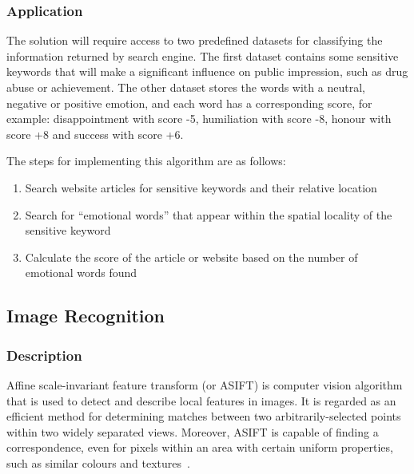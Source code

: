    \subsubsection{Application}

      The solution will require access to two predefined datasets for classifying the information returned by search engine. The first dataset contains some sensitive keywords that will make a significant influence on public impression, such as drug abuse or achievement. The other dataset stores the words with a neutral, negative or positive emotion, and each word has a corresponding score, for example: disappointment with score -5, humiliation with score -8, honour with score +8 and success with score +6. 

      The steps for implementing this algorithm are as follows:
      \begin{enumerate}
        \item Search website articles for sensitive keywords and their relative location
        \item Search for ``emotional words'' that appear within the spatial locality of the sensitive keyword
        \item Calculate the score of the article or website based on the number of emotional words found
      \end{enumerate}

  \subsection{Image Recognition}

    \subsubsection{Description}

      Affine scale-invariant feature transform (or ASIFT) is computer vision algorithm that is used to detect and describe local features in images. It is regarded as an efficient method for determining matches between two arbitrarily-selected points within two widely separated views. Moreover, ASIFT is capable of finding a correspondence, even for pixels within an area with certain uniform properties, such as similar colours and textures~\cite{}.

